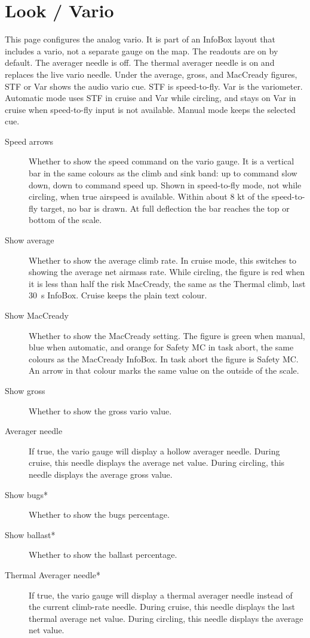 \section{Look / Vario}\label{sec:vario-gauge}

This page configures the analog vario. It is part of an InfoBox layout
that includes a vario, not a separate gauge on the map. The readouts
are on by default. The averager needle is off. The thermal averager
needle is on and replaces the live vario needle. Under the average,
gross, and MacCready figures, STF or Var shows the audio vario cue.
STF is speed-to-fly. Var is the variometer. Automatic mode uses STF
in cruise and Var while circling, and stays on Var in cruise when
speed-to-fly input is not available. Manual mode keeps the selected
cue.

\begin{description}
\item[Speed arrows]  \label{conf:variogauge} Whether to show the speed
  command on the vario gauge. It is a vertical bar in the same colours
  as the climb and sink band: up to command slow down, down to command
  speed up.
  Shown in speed-to-fly mode, not while circling, when true airspeed
  is available. Within about 8 kt of the speed-to-fly target, no bar
  is drawn. At full deflection the bar reaches the top or bottom of
  the scale.
\item[Show average]  Whether to show the average climb rate.  In cruise mode, this
  switches to showing the average net airmass rate.
  While circling, the figure is red when it is less than half the risk
  MacCready, the same as the Thermal climb, last 30~s InfoBox.
  Cruise keeps the plain text colour.
\item[Show MacCready]  Whether to show the MacCready setting.
  The figure is green when manual, blue when automatic, and orange
  for Safety MC in task abort, the same colours as the MacCready
  InfoBox. In task abort the figure is Safety MC. An arrow in that
  colour marks the same value on the outside of the scale.
\item[Show gross]  Whether to show the gross vario value.
\item[Averager needle]  If true, the vario gauge will display a hollow averager
  needle. During cruise, this needle displays the average net value. During circling,
  this needle displays the average gross value.
\item[Show bugs*]  Whether to show the bugs percentage.
\item[Show ballast*]  Whether to show the ballast percentage.
\item[Thermal Averager needle*]  If true, the vario gauge will display a thermal
  averager needle instead of the current climb-rate needle. During cruise, this
  needle displays the last thermal average net value. During circling, this
  needle displays the average net value.
\end{description}


